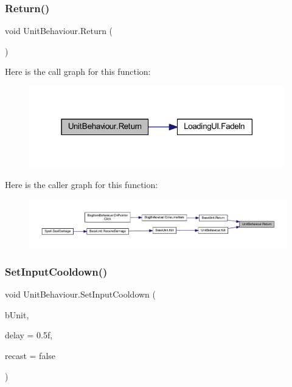 \subsubsection{\texorpdfstring{Return()}{Return()}}
{\footnotesize\ttfamily void Unit\+Behaviour.\+Return (\begin{DoxyParamCaption}{ }\end{DoxyParamCaption})}

Here is the call graph for this function\+:\nopagebreak
\begin{figure}[H]
\begin{center}
\leavevmode
\includegraphics[width=315pt]{class_unit_behaviour_a4b2664ef7a33e795220d587cb789d169_cgraph}
\end{center}
\end{figure}
Here is the caller graph for this function\+:\nopagebreak
\begin{figure}[H]
\begin{center}
\leavevmode
\includegraphics[width=350pt]{class_unit_behaviour_a4b2664ef7a33e795220d587cb789d169_icgraph}
\end{center}
\end{figure}
\mbox{\label{class_unit_behaviour_aa4e86ce34131fe81ecef7a56855f8d94}} 
\subsubsection{\texorpdfstring{SetInputCooldown()}{SetInputCooldown()}}
{\footnotesize\ttfamily void Unit\+Behaviour.\+Set\+Input\+Cooldown (\begin{DoxyParamCaption}\item[{\mbox{\hyperlink{class_base_unit}{Base\+Unit}}}]{b\+Unit,  }\item[{float}]{delay = {\ttfamily 0.5f},  }\item[{bool}]{recast = {\ttfamily false} }\end{DoxyParamCaption})}

